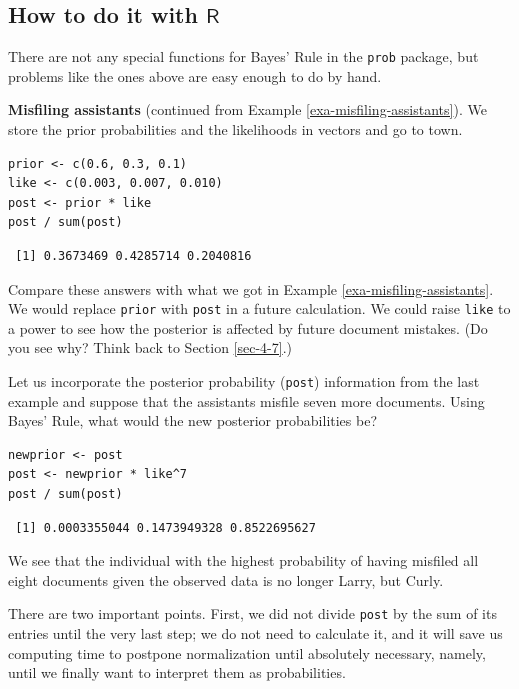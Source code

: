 \documentclass[captions=tableheading]{scrbook}
\begin{document}
\subsection{How to do it with \(\mathsf{R}\)}
\label{sec-4-8-1}


There are not any special functions for Bayes' Rule in the \texttt{prob} package, but problems like the ones above are easy enough to do by hand.

\begin{example}
\textbf{Misfiling assistants} (continued from Example \ref{exa-misfiling-assistants}). We store the prior probabilities and the likelihoods in vectors and go to town.


\begin{verbatim}
prior <- c(0.6, 0.3, 0.1)
like <- c(0.003, 0.007, 0.010)
post <- prior * like
post / sum(post)
\end{verbatim}

\begin{verbatim}
 [1] 0.3673469 0.4285714 0.2040816
\end{verbatim}

\end{example}


Compare these answers with what we got in Example \ref{exa-misfiling-assistants}. We would replace \texttt{prior} with \texttt{post} in a future calculation. We could raise \texttt{like} to a power to see how the posterior is affected by future document mistakes. (Do you see why? Think back to Section \ref{sec-4-7}.)


\begin{example}
Let us incorporate the posterior probability (\texttt{post}) information from the last example and suppose that the assistants misfile seven more documents. Using Bayes' Rule, what would the new posterior probabilities be?


\begin{verbatim}
newprior <- post
post <- newprior * like^7
post / sum(post)
\end{verbatim}

\begin{verbatim}
 [1] 0.0003355044 0.1473949328 0.8522695627
\end{verbatim}

We see that the individual with the highest probability of having misfiled all eight documents given the observed data is no longer Larry, but Curly. 
\end{example}

There are two important points. First, we did not divide \texttt{post} by the sum of its entries until the very last step; we do not need to calculate it, and it will save us computing time to postpone normalization until absolutely necessary, namely, until we finally want to interpret them as probabilities.
\end{document}
